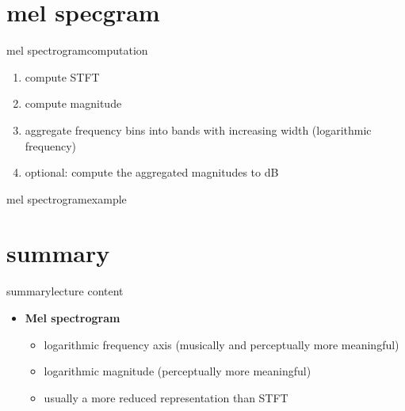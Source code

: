     \section[mel specgram]{mel specgram}
        \begin{frame}{mel spectrogram}{computation}
            \begin{enumerate}
                \item<1-> compute STFT
                \item<2-> compute magnitude
                \item<3-> aggregate frequency bins into bands with increasing width (logarithmic frequency)
                \item<4-> optional: compute the aggregated magnitudes to dB
            \end{enumerate}
        \end{frame}	

        \begin{frame}{mel spectrogram}{example}
        \end{frame}	

    \section{summary}
        \begin{frame}{summary}{lecture content}
            \begin{itemize}
                \item   \textbf{Mel spectrogram}
                    \begin{itemize}
                        \item   logarithmic frequency axis (musically and perceptually more meaningful)
                        \item   logarithmic magnitude (perceptually more meaningful)
                        \item   usually a more reduced representation than STFT
                    \end{itemize}
            \end{itemize}
        \end{frame}

